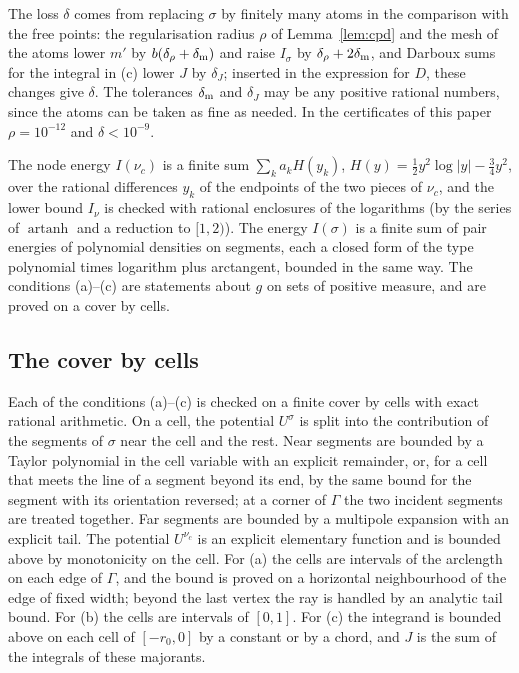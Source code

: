 \documentclass[11pt]{amsart}
\theoremstyle{definition}
\theoremstyle{remark}
\numberwithin{equation}{section}
\begin{document}
The loss $\delta$ comes from replacing $\sigma$ by finitely many atoms in the comparison with the free points: the
regularisation radius $\rho$ of Lemma~\ref{lem:cpd} and the mesh of the atoms lower $m'$ by $b(\delta_\rho+\delta_{\rm m})$ and
raise $I_\sigma$ by $\delta_\rho+2\delta_{\rm m}$, and Darboux sums for the integral in (c) lower $J$ by $\delta_J$; inserted in
the expression for $D$, these changes give $\delta$. The tolerances $\delta_{\rm m}$ and $\delta_J$ may be any positive rational
numbers, since the atoms can be taken as fine as needed. In the certificates of this paper $\rho=10^{-12}$ and
$\delta<10^{-9}$.

The node energy $I(\nu_c)$ is a finite sum $\sum_ka_kH(y_k)$, $H(y)=\frac12y^2\log|y|-\frac34y^2$, over the rational
differences $y_k$ of the endpoints of the two pieces of $\nu_c$, and the lower bound $I_\nu$ is checked with rational
enclosures of the logarithms (by the series of $\operatorname{artanh}$ and a reduction to $[1,2)$). The energy
$I(\sigma)$ is a finite sum of pair energies of polynomial densities on segments, each a closed form of the type
polynomial times logarithm plus arctangent, bounded in the same way. The conditions (a)--(c) are statements about
$g$ on sets of positive measure, and are proved on a cover by cells.

\subsection{The cover by cells}\label{ssec:slope-cert}
Each of the conditions (a)--(c) is checked on a finite cover by cells with exact rational arithmetic. On a cell, the
potential $U^\sigma$ is split into the contribution of the segments of $\sigma$ near the cell and the rest. Near segments
are bounded by a Taylor polynomial in the cell variable with an explicit remainder, or, for a cell that meets the line
of a segment beyond its end, by the same bound for the segment with its orientation reversed; at a corner of $\Gamma$
the two incident segments are treated together. Far segments are bounded by a multipole expansion with an explicit
tail. The potential $U^{\nu_c}$ is an explicit elementary function and is bounded above by monotonicity on the cell.
For (a) the cells are intervals of the arclength on each edge of $\Gamma$, and the bound is proved on a horizontal
neighbourhood of the edge of fixed width; beyond the last vertex the ray is handled by an analytic tail bound. For (b)
the cells are intervals of $[0,1]$. For (c) the integrand is bounded above on each cell of $[-r_0,0]$ by a constant or by
a chord, and $J$ is the sum of the integrals of these majorants.
\end{document}
